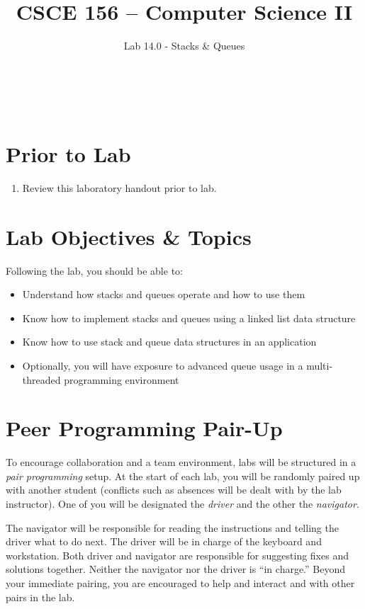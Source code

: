 \documentclass[12pt]{scrartcl}
\title{CSCE 156 -- Computer Science II}
\subtitle{Lab 14.0 - Stacks \& Queues}
\author{~}
\date{~}
\begin{document}
\maketitle

\section*{Prior to Lab}

\begin{enumerate}
  \item Review this laboratory handout prior to lab.
\end{enumerate}

\section*{Lab Objectives \& Topics}
Following the lab, you should be able to:
\begin{itemize}
  \item Understand how stacks and queues operate and how to use them
  \item Know how to implement stacks and queues using a linked list 
    data structure
  \item Know how to use stack and queue data structures in an application
  \item Optionally, you will have exposure to advanced queue usage 
    in a multi-threaded programming environment
\end{itemize}


\section*{Peer Programming Pair-Up}

To encourage collaboration and a team environment, labs will be
structured in a \emph{pair programming} setup.  At the start of
each lab, you will be randomly paired up with another student 
(conflicts such as absences will be dealt with by the lab instructor).
One of you will be designated the \emph{driver} and the other
the \emph{navigator}.  

The navigator will be responsible for reading the instructions and
telling the driver what to do next.  The driver will be in charge of the
keyboard and workstation.  Both driver and navigator are responsible
for suggesting fixes and solutions together.  Neither the navigator
nor the driver is ``in charge.''  Beyond your immediate pairing, you
are encouraged to help and interact and with other pairs in the lab.
\end{document}
